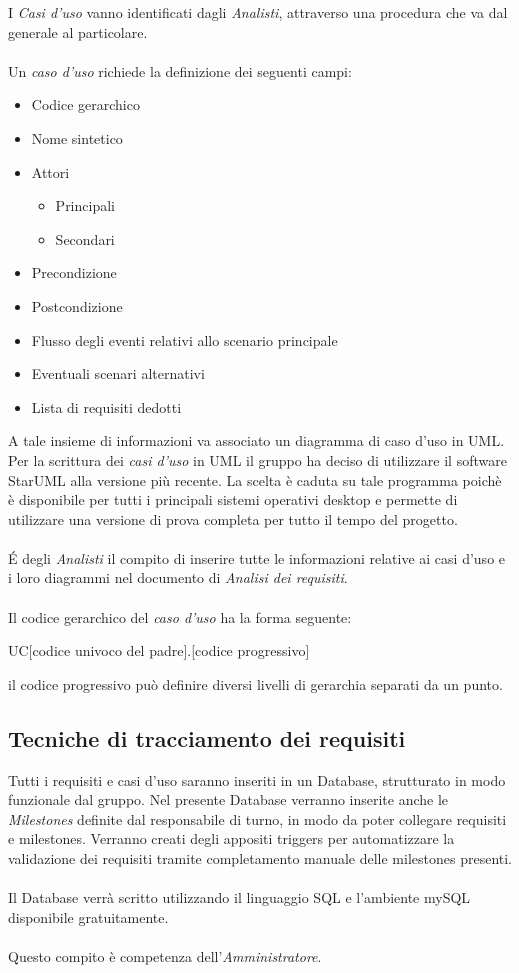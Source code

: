 \documentclass[a4paper]{report}
\begin{document}
		 I \emph{Casi d'uso} vanno identificati dagli \emph{Analisti}, attraverso una procedura che va dal generale al
		  particolare. 
		  \\ \\
		 Un \emph{caso d'uso} richiede la definizione dei seguenti campi:
		 \begin{itemize}
		 	\item Codice gerarchico 
		 	\item Nome sintetico
		 	\item Attori
		 	\begin{itemize}
		 		\item Principali
		 		\item Secondari
		 	\end{itemize}
		 	\item Precondizione
		 	\item Postcondizione
		 	\item Flusso degli eventi relativi allo scenario principale
		 	\item Eventuali scenari alternativi
		 	\item Lista di requisiti dedotti 
		 \end{itemize}
		 A tale insieme di informazioni va associato un diagramma di caso d'uso in UML. Per la scrittura dei
		  \emph{casi d'uso} in UML il gruppo ha deciso di utilizzare il software StarUML alla versione più recente. La scelta è 
		 caduta su tale programma poichè è disponibile per tutti i principali sistemi operativi desktop e permette di
		  utilizzare una versione di prova completa per tutto il tempo del progetto.
		  \\ \\
		  \'E degli \emph{Analisti} il compito di inserire tutte le informazioni relative ai casi d'uso e i loro diagrammi nel 
		  documento di \emph{Analisi dei requisiti}.
		  \\ \\
		 Il codice gerarchico del \emph{caso d'uso} ha la forma seguente:
		 \begin{center}
		 	UC[codice univoco del padre].[codice progressivo]
		 \end{center}
		 il codice progressivo può definire diversi livelli di gerarchia separati da un punto.
	\subsection{Tecniche di tracciamento dei requisiti}
		Tutti i requisiti e casi d'uso saranno inseriti in un Database, strutturato in modo funzionale dal gruppo. Nel presente Database verranno
		inserite anche le \emph{Milestones} definite dal responsabile di turno, in modo da poter collegare requisiti e milestones. 
		Verranno creati degli appositi triggers per automatizzare la validazione dei requisiti tramite completamento manuale delle
		milestones presenti. 
		\\ \\ 
		Il Database verrà scritto utilizzando il linguaggio SQL e l'ambiente mySQL disponibile gratuitamente.
		\\ \\
		Questo compito è competenza dell'\emph{Amministratore}.
\end{document}
